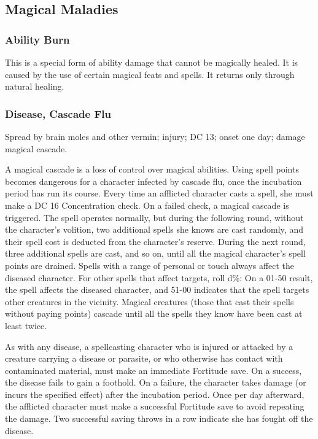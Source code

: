 \documentclass[../VancianToPsionics.tex]{subfiles}
\begin{document}
\subsection{Magical Maladies}
\subsubsection{Ability Burn}
This is a special form of ability damage that cannot be magically healed. It is caused by the use of certain magical feats and spells. It returns only through natural healing.

\subsubsection{Disease, Cascade Flu}
Spread by brain moles and other vermin; injury; DC 13; onset one day; damage magical cascade.

A magical cascade is a loss of control over magical abilities. Using spell points becomes dangerous for a character infected by cascade flu, once the incubation period has run its course. Every time an afflicted character casts a spell, she must make a DC 16 Concentration check. On a failed check, a magical cascade is triggered. The spell operates normally, but during the following round, without the character's volition, two additional spells she knows are cast randomly, and their spell cost is deducted from the character's reserve. During the next round, three additional spells are cast, and so on, until all the magical character's spell points are drained. Spells with a range of personal or touch always affect the diseased character. For other spells that affect targets, roll d\%: On a 01-50 result, the spell affects the diseased character, and 51-00 indicates that the spell targets other creatures in the vicinity. Magical creatures (those that cast their spells without paying points) cascade until all the spells they know have been cast at least twice. 

As with any disease, a spellcasting character who is injured or attacked by a creature carrying a disease or parasite, or who otherwise has contact with contaminated material, must make an immediate Fortitude save. On a success, the disease fails to gain a foothold. On a failure, the character takes damage (or incurs the specified effect) after the incubation period. Once per day afterward, the afflicted character must make a successful Fortitude save to avoid repeating the damage. Two successful saving throws in a row indicate she has fought off the disease.
\end{document}
